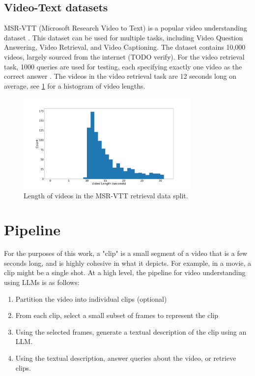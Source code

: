 \documentclass{article}
\begin{document}
\subsection{Video-Text datasets}
MSR-VTT (Microsoft Research Video to Text) is a popular video understanding dataset \cite{msr-vtt}.
This dataset can be used for multiple tasks, including Video Question Answering, Video Retrieval, and Video Captioning.
The dataset contains 10,000 videos, largely sourced from the internet (TODO verify).
For the video retrieval task, 1000 queries are used for testing, each specifying exactly one video as the correct answer \cite{jsfusion}.
The videos in the video retrieval task are 12 seconds long on average, see \ref{fig:length_histogram} for a histogram of video lengths.

\begin{figure}
      \centering
      \includegraphics[width=0.8\textwidth]{figures/msr-vtt-length-histogram.png}
      \caption{Length of videos in the MSR-VTT retrieval data split.}
      \label{fig:length_histogram}
\end{figure}

\section{Pipeline}


For the purposes of this work, a "clip" is a small segment of a video that is a few seconds long, 
and is highly cohesive in what it depicts. For example, in a movie, a clip might be a single shot.
At a high level, the pipeline for video understanding using LLMs is as follows:
\begin{enumerate}
      \item Partition the video into individual clips (optional)
      \item From each clip, select a small subset of frames to represent the clip
      \item Using the selected frames, generate a textual description of the clip using an LLM.
      \item Using the textual description, answer queries about the video, or retrieve clips.
\end{enumerate}
\end{document}
